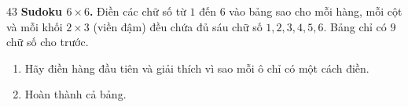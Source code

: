 \begin{probbox}{43}{}
\textbf{Sudoku $6\times 6$.} Điền các chữ số từ $1$ đến $6$ vào bảng sao cho mỗi hàng, mỗi cột và mỗi khối $2\times 3$ (viền đậm)
đều chứa đủ sáu chữ số $1, 2, 3, 4, 5, 6$. Bảng chỉ có $9$ chữ số cho trước.
\begin{enumerate}[label=\alph*),leftmargin=1.6em,itemsep=1pt,topsep=2pt]
  \item Hãy điền hàng đầu tiên và giải thích vì sao mỗi ô chỉ có một cách điền.
  \item Hoàn thành cả bảng.
\end{enumerate}
\begin{figC}
\end{figC}
\end{probbox}
